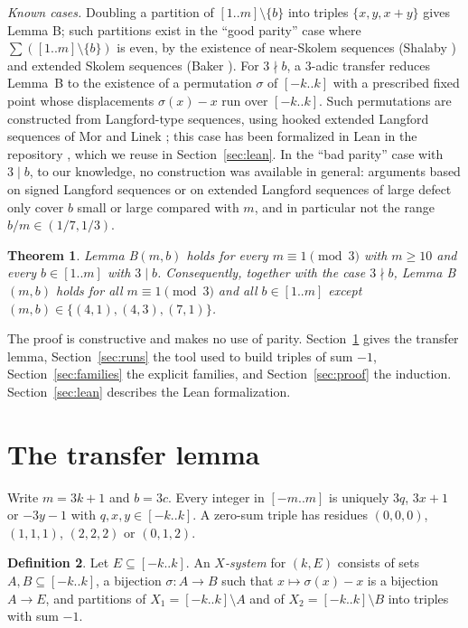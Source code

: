 \documentclass[11pt]{amsart}
\newtheorem{theorem}{Theorem}[section]
\theoremstyle{definition}
\newtheorem{definition}[theorem]{Definition}
\theoremstyle{remark}
\newcommand{\Icc}[2]{[#1..#2]}
\begin{document}
\emph{Known cases.} Doubling a partition of $[1..m]\setminus\{b\}$ into triples $\{x,y,x+y\}$ gives Lemma B;
such partitions exist in the ``good parity'' case where $\sum([1..m]\setminus\{b\})$ is even, by the
existence of near-Skolem sequences (Shalaby \cite{Sh}) and extended Skolem sequences (Baker \cite{Ba}).
For $3\nmid b$, a $3$-adic transfer reduces Lemma~B to the existence of a permutation $\sigma$ of $\Icc{-k}{k}$
with a prescribed fixed point whose displacements $\sigma(x)-x$ run over $\Icc{-k}{k}$. Such permutations are
constructed from Langford-type sequences, using hooked extended Langford sequences of Mor and Linek \cite{ML};
this case has been formalized in Lean in the repository \cite{Jo}, which we reuse in Section~\ref{sec:lean}.
In the ``bad parity'' case with $3\mid b$, to our knowledge, no construction was available in general: arguments
based on signed Langford sequences \cite{BJ,JM} or on extended Langford sequences of large defect \cite{LM} only
cover $b$ small or large compared with $m$, and in particular not the range $b/m\in(1/7,1/3)$.

\begin{theorem}\label{thm:main}
Lemma B$(m,b)$ holds for every $m\equiv1\pmod3$ with $m\ge10$ and every $b\in\Icc{1}{m}$ with $3\mid b$.
Consequently, together with the case $3\nmid b$, Lemma B$(m,b)$ holds for all $m\equiv 1\pmod 3$ and all
$b\in\Icc1m$ except $(m,b)\in\{(4,1),(4,3),(7,1)\}$.
\end{theorem}

The proof is constructive and makes no use of parity. Section~\ref{sec:transfer} gives the transfer lemma,
Section~\ref{sec:runs} the tool used to build triples of sum $-1$, Section~\ref{sec:families} the explicit families,
and Section~\ref{sec:proof} the induction. Section~\ref{sec:lean} describes the Lean formalization.

\section{The transfer lemma}\label{sec:transfer}

Write $m=3k+1$ and $b=3c$. Every integer in $\Icc{-m}{m}$ is uniquely $3q$, $3x+1$ or $-3y-1$ with
$q,x,y\in\Icc{-k}{k}$. A zero-sum triple has residues $(0,0,0)$, $(1,1,1)$, $(2,2,2)$ or $(0,1,2)$.

\begin{definition}
Let $E\subseteq\Icc{-k}{k}$. An \emph{$X$-system} for $(k,E)$ consists of sets $A,B\subseteq\Icc{-k}{k}$, a bijection
$\sigma:A\to B$ such that $x\mapsto\sigma(x)-x$ is a bijection $A\to E$, and partitions of
$X_1=\Icc{-k}{k}\setminus A$ and of $X_2=\Icc{-k}{k}\setminus B$ into triples with sum $-1$.
\end{definition}
\end{document}
